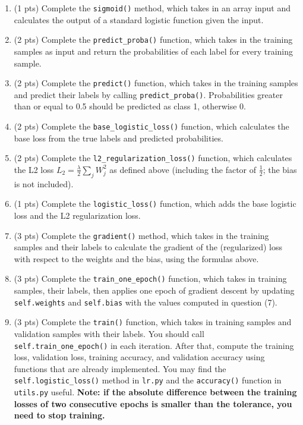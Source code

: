 \documentclass{article}
\begin{document}
\begin{enumerate}
    \item (1 pts) Complete the \texttt{sigmoid()} method, which takes in an array input and calculates the output of a standard logistic function given the input.
    
    \item (2 pts) Complete the \texttt{predict\_\allowbreak proba()} function, which takes in the training samples as input and return the probabilities of each label for every training sample.
    
    \item (2 pts) Complete the \texttt{predict()} function, which takes in the training samples and predict their labels by calling \texttt{predict\_\allowbreak proba()}. Probabilities greater than or equal to 0.5 should be predicted as class 1, otherwise 0.

    \item (2 pts) Complete the \texttt{base\_\allowbreak logistic\_\allowbreak loss()} function, which calculates the base loss from the true labels and predicted probabilities.

    \item (2 pts) Complete the \texttt{l2\_\allowbreak regularization\_\allowbreak loss()} function, which calculates the L2 loss \(L_2 = \frac{\lambda}{2} \sum_j W_j^2\) as defined above (including the factor of \(\tfrac12\); the bias is not included).
    
    \item (1 pts) Complete the \texttt{logistic\_\allowbreak loss()} function, which adds the base logistic loss and the L2 regularization loss.

    \item (3 pts) Complete the \texttt{gradient()} method, which takes in the training samples and their labels to calculate the gradient of the (regularized) loss with respect to the weights and the bias, using the formulas above.
    
    \item (3 pts) Complete the \texttt{train\_\allowbreak one\_\allowbreak epoch()} function, which takes in training samples, their labels, then applies one epoch of gradient descent by updating \texttt{self.weights} and \texttt{self.bias} with the values computed in question (7).
    
    \item (3 pts) Complete the \texttt{train()} function, which takes in training samples and validation samples with their labels. You should call \texttt{self.train\_\allowbreak one\_\allowbreak epoch()} in each iteration. After that, compute the training loss, validation loss, training accuracy, and validation accuracy using functions that are already implemented. You may find the \texttt{self.logistic\_\allowbreak loss()} method in \texttt{lr.py} and the \texttt{accuracy()} function in \texttt{utils.py} useful. \textbf{Note: if the absolute difference between the training losses of two consecutive epochs is smaller than the tolerance, you need to stop training.}
    

\end{enumerate}
\end{document}
